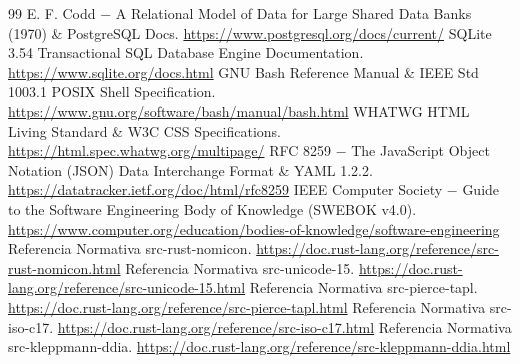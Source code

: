 \documentclass{book}
\begin{document}
\begin{thebibliography}{99}
 E. F. Codd \(-\) A Relational Model of Data for Large Shared Data Banks (1970) \& PostgreSQL Docs. \url{https://www.postgresql.org/docs/current/}
 SQLite 3.54 Transactional SQL Database Engine Documentation. \url{https://www.sqlite.org/docs.html}
 GNU Bash Reference Manual \& IEEE Std 1003.1 POSIX Shell Specification. \url{https://www.gnu.org/software/bash/manual/bash.html}
 WHATWG HTML Living Standard \& W3C CSS Specifications. \url{https://html.spec.whatwg.org/multipage/}
 RFC 8259 \(-\) The JavaScript Object Notation (JSON) Data Interchange Format \& YAML 1.2.2. \url{https://datatracker.ietf.org/doc/html/rfc8259}
 IEEE Computer Society \(-\) Guide to the Software Engineering Body of Knowledge (SWEBOK v4.0). \url{https://www.computer.org/education/bodies-of-knowledge/software-engineering}
 Referencia Normativa src-rust-nomicon. \url{https://doc.rust-lang.org/reference/src-rust-nomicon.html}
 Referencia Normativa src-unicode-15. \url{https://doc.rust-lang.org/reference/src-unicode-15.html}
 Referencia Normativa src-pierce-tapl. \url{https://doc.rust-lang.org/reference/src-pierce-tapl.html}
 Referencia Normativa src-iso-c17. \url{https://doc.rust-lang.org/reference/src-iso-c17.html}
 Referencia Normativa src-kleppmann-ddia. \url{https://doc.rust-lang.org/reference/src-kleppmann-ddia.html}
\end{thebibliography}
\end{document}
